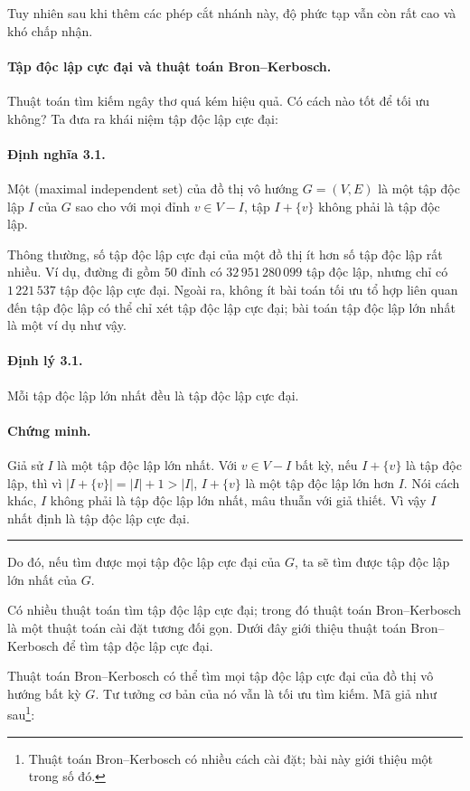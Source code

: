 \documentclass[11pt]{article}
\newcommand{\qedmark}{\hfill\rule{0.7ex}{0.7ex}}
\begin{document}
Tuy nhiên sau khi thêm các phép cắt nhánh này, độ phức tạp vẫn còn rất cao và
khó chấp nhận.

\paragraph{Tập độc lập cực đại và thuật toán Bron--Kerbosch.}
Thuật toán tìm kiếm ngây thơ quá kém hiệu quả. Có cách nào tốt để tối ưu không?
Ta đưa ra khái niệm tập độc lập cực đại:

\paragraph{Định nghĩa 3.1.}
Một  (maximal independent set) của đồ thị vô hướng
\(G=(V,E)\) là một tập độc lập \(I\) của \(G\) sao cho với mọi đỉnh
\(v\in V-I\), tập \(I+\{v\}\) không phải là tập độc lập.

Thông thường, số tập độc lập cực đại của một đồ thị ít hơn số tập độc lập rất
nhiều. Ví dụ, đường đi gồm \(50\) đỉnh có \(32\,951\,280\,099\) tập độc lập,
nhưng chỉ có \(1\,221\,537\) tập độc lập cực đại. Ngoài ra, không ít bài toán
tối ưu tổ hợp liên quan đến tập độc lập có thể chỉ xét tập độc lập cực đại;
bài toán tập độc lập lớn nhất là một ví dụ như vậy.

\paragraph{Định lý 3.1.}
Mỗi tập độc lập lớn nhất đều là tập độc lập cực đại.

\paragraph{Chứng minh.}
Giả sử \(I\) là một tập độc lập lớn nhất. Với \(v\in V-I\) bất kỳ, nếu
\(I+\{v\}\) là tập độc lập, thì vì \(|I+\{v\}|=|I|+1>|I|\), \(I+\{v\}\) là một
tập độc lập lớn hơn \(I\). Nói cách khác, \(I\) không phải là tập độc lập lớn
nhất, mâu thuẫn với giả thiết. Vì vậy \(I\) nhất định là tập độc lập cực đại.
\qedmark

Do đó, nếu tìm được mọi tập độc lập cực đại của \(G\), ta sẽ tìm được tập độc
lập lớn nhất của \(G\).

Có nhiều thuật toán tìm tập độc lập cực đại; trong đó thuật toán
Bron--Kerbosch là một thuật toán cài đặt tương đối gọn. Dưới đây giới thiệu
thuật toán Bron--Kerbosch để tìm tập độc lập cực đại.

Thuật toán Bron--Kerbosch có thể tìm mọi tập độc lập cực đại của đồ thị vô
hướng bất kỳ \(G\). Tư tưởng cơ bản của nó vẫn là tối ưu tìm kiếm. Mã giả như
sau\footnote{Thuật toán Bron--Kerbosch có nhiều cách cài đặt; bài này giới
thiệu một trong số đó.}:
\end{document}

